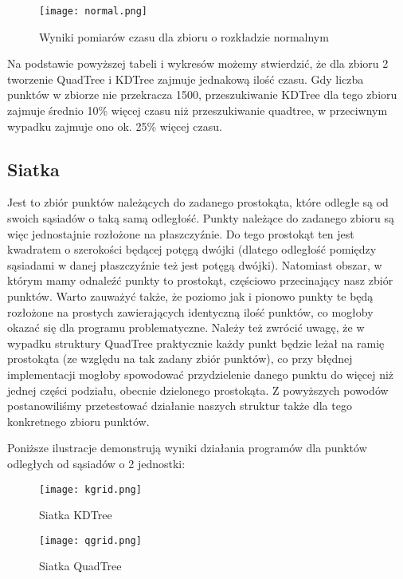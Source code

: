 \documentclass[a4paper, 12pt]{article}
\begin{document}
      \begin{figure}[h!]
      \centering
        \texttt{[image: normal.png]}
        \caption{Wyniki pomiarów czasu dla zbioru o rozkładzie normalnym}
      \end{figure}

      \noindent
      \quad Na podstawie powyższej tabeli i wykresów możemy stwierdzić, że dla zbioru 2 tworzenie QuadTree i KDTree zajmuje jednakową ilość czasu. Gdy liczba punktów w zbiorze nie przekracza 1500, przeszukiwanie KDTree dla tego zbioru  zajmuje średnio 10\% więcej czasu niż przeszukiwanie quadtree, w przeciwnym wypadku zajmuje ono ok. 25\% więcej czasu.

    \subsection{Siatka}
      \quad Jest to zbiór punktów należących do zadanego prostokąta, które odległe są od swoich sąsiadów o taką samą odległość. Punkty należące do zadanego zbioru są więc jednostajnie rozłożone na płaszczyźnie. Do tego prostokąt ten jest kwadratem o szerokości będącej potęgą dwójki (dlatego odległość pomiędzy sąsiadami w danej płaszczyźnie też jest potęgą dwójki). Natomiast obszar, w którym mamy odnaleźć punkty to prostokąt, częściowo przecinający nasz zbiór punktów. Warto zauważyć także, że poziomo jak i pionowo punkty te będą rozłożone na prostych zawierających identyczną ilość punktów, co mogłoby okazać się dla programu problematyczne. Należy też zwrócić uwagę, że w wypadku struktury QuadTree praktycznie każdy punkt będzie leżał na ramię prostokąta (ze względu na tak zadany zbiór punktów), co przy błędnej implementacji mogłoby spowodować przydzielenie danego punktu do więcej niż jednej części podziału, obecnie dzielonego prostokąta. Z powyższych powodów postanowiliśmy przetestować działanie naszych struktur także dla tego konkretnego zbioru punktów.

      \noindent
      \quad Poniższe ilustracje demonstrują wyniki działania programów dla punktów odległych od sąsiadów o 2 jednostki:

      \begin{figure}[h!]
      \centering
        \texttt{[image: kgrid.png]}
        \caption{Siatka KDTree}
      \end{figure}

      \begin{figure}[h!]
      \centering
        \texttt{[image: qgrid.png]}
        \caption{Siatka QuadTree}
      \end{figure}
\end{document}
